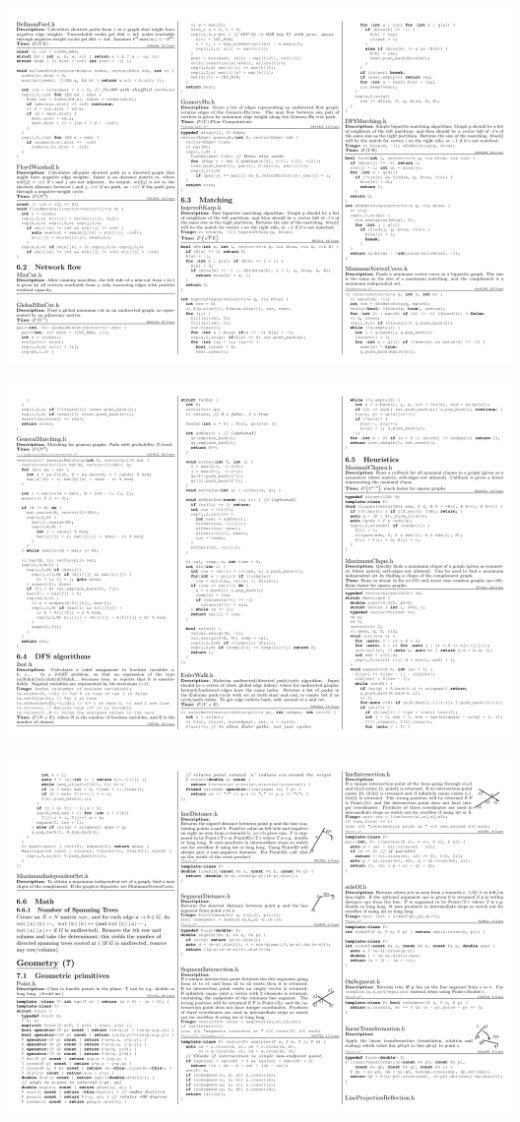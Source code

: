 \documentclass[10pt]{article}
\begin{document}
\begin{landscape}
\centerline{\includegraphics[scale=0.95]{kactl/kactl-3.pdf}}
\centerline{\includegraphics[scale=0.95]{kactl/kactl-4.pdf}}
\centerline{\includegraphics[scale=0.95]{kactl/kactl-5.pdf}}

\end{landscape}
\end{document}

